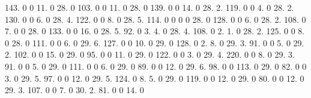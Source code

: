 143. 0 0 11. 0 28. 0 103. 0 0 11. 0 28. 0 139. 0 0 14. 0 28. 2. 119. 0 0 4. 0 28. 2. 130. 0 0 6. 0 28. 4. 122. 0 0 8. 0 28. 5. 114. 0 0 0 0 28. 0 128. 0 0 6. 0 28. 2. 108. 0 7. 0 0 28. 0 133. 0 0 16. 0 28. 5. 92. 0 3. 4. 0 28. 4. 108. 0 2. 1. 0 28. 2. 125. 0 0 8. 0 28. 0 111. 0 0 6. 0 29. 6. 127. 0 0 10. 0 29. 0 128. 0 2. 8. 0 29. 3. 91. 0 0 5. 0 29. 2. 102. 0 0 15. 0 29. 0 95. 0 0 11. 0 29. 0 122. 0 0 3. 0 29. 4. 220. 0 0 8. 0 29. 3. 91. 0 0 5. 0 29. 0 111. 0 0 6. 0 29. 0 89. 0 0 12. 0 29. 6. 98. 0 0 113. 0 29. 0 82. 0 0 3. 0 29. 5. 97. 0 0 12. 0 29. 5. 124. 0 8. 5. 0 29. 0 119. 0 0 12. 0 29. 0 80. 0 0 12. 0 29. 3. 107. 0 0 7. 0 30. 2. 81. 0 0 14. 0 